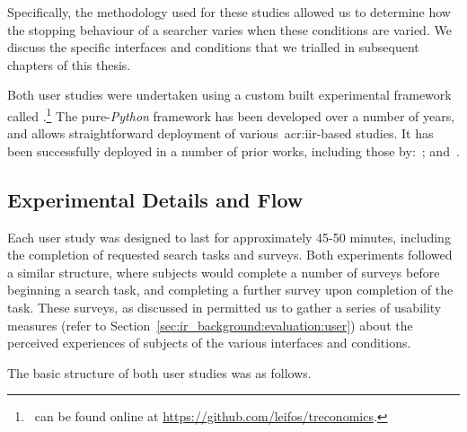 Specifically, the methodology used for these studies allowed us to determine how the stopping behaviour of a searcher varies when these conditions are varied. We discuss the specific interfaces and conditions that we trialled in subsequent chapters of this thesis.

Both user studies were undertaken using a custom built experimental framework called .\footnote{\treconomics~can be found online at \url{https://github.com/leifos/treconomics}. } The pure-\emph{Python} framework has been developed over a number of years, and allows straightforward deployment of various~\gls{acr:iir}-based studies. It has been successfully deployed in a number of prior works, including those by:~\cite{azzopardi2013query_cost, maxwell2014temporal_delays, kelly2015serp_size, edwards2015query_interface}; and~\cite{crescenzi2016time_constraints}.


\subsection{Experimental Details and Flow}\label{sec:methodology:user:flow}
Each user study was designed to last for approximately 45-50 minutes, including the completion of requested search tasks and surveys. Both experiments followed a similar structure, where subjects would complete a number of surveys before beginning a search task, and completing a further survey upon completion of the task. These surveys, as discussed in  permitted us to gather a series of usability measures (refer to Section~\ref{sec:ir_background:evaluation:user}) about the perceived experiences of subjects of the various interfaces and conditions.

The basic structure of both user studies was as follows.


